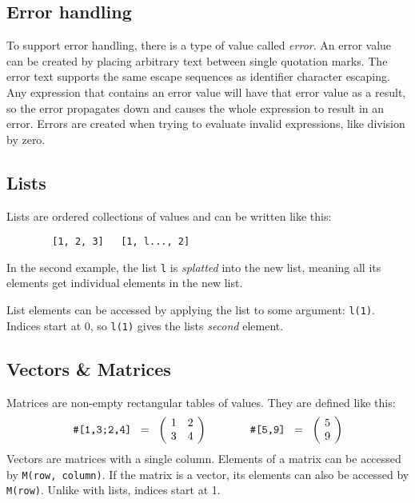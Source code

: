 \documentclass[10pt]{article}
\begin{document}
    \subsection{Error handling}\label{subsec:error-handling}
    To support error handling, there is a type of value called \textsl{error}.
    An error value can be created by placing arbitrary text between single quotation marks.
    The error text supports the same escape sequences as identifier character escaping.
    Any expression that contains an error value will have that error value as a result, so the error propagates down and causes the whole expression to result in an error.
    Errors are created when trying to evaluate invalid expressions, like division by zero.
    
    \subsection{Lists}\label{subsec:lists}
    Lists are ordered collections of values and can be written like this:
    \begin{verbatim}
        [1, 2, 3]   [1, l..., 2]
    \end{verbatim}
    In the second example, the list \verb|l| is \textsl{splatted} into the new list, meaning all its elements get individual elements in the new list.
    
    List elements can be accessed by applying the list to some argument: \verb|l(1)|.
    Indices start at $ 0 $, so \verb|l(1)| gives the lists \textsl{second} element.
    
    \subsection{Vectors \& Matrices}\label{subsec:vectors-matrices}
    Matrices are non-empty rectangular tables of values.
    They are defined like this:
    \[
        \verb|#[1,3;2,4]| \;\; = \;\; \biggl(\kern-\nulldelimiterspace\begin{array}{cc}
            1 & 2 \\
            3 & 4 \\
        \end{array}\kern-\nulldelimiterspace\biggr)
        \qquad\qquad
        \verb|#[5,9]| \;\; = \;\; \biggl(\kern-\nulldelimiterspace\begin{array}{c}
            5 \\ 9
        \end{array}\kern-\nulldelimiterspace\biggr)
    \]
    Vectors are matrices with a single column.
    Elements of a matrix can be accessed by \verb|M(row, column)|.
    If the matrix is a vector, its elements can also be accessed by \verb|M(row)|.
    Unlike with lists, indices start at 1.
\end{document}
